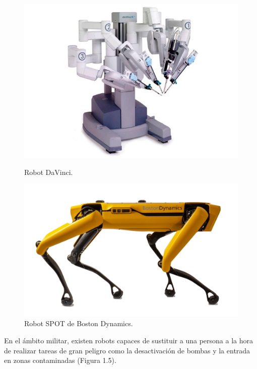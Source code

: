 \documentclass[a4paper, 12pt]{book}
\begin{document}
\begin{figure}[H]
  \centering
  \begin{minipage}[b]{0.4\textwidth}
    \includegraphics[width=\textwidth]{img/davinci}
    \caption{Robot DaVinci.}
    \label{figura:robot_davinci}
  \end{minipage}
  \hfill
  \begin{minipage}[b]{0.4\textwidth}
    \includegraphics[width=\textwidth]{img/spot_bd.png}
    \caption{Robot SPOT de Boston Dynamics.}
    \label{figura:robot_atrias}
  \end{minipage}
\end{figure}

En el ámbito militar, existen robots capaces de sustituir a una persona a la hora de realizar tareas de gran peligro como la desactivación de bombas y la entrada en zonas contaminadas (Figura 1.5).
\end{document}
